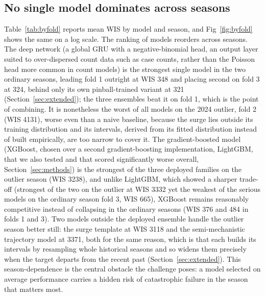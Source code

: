 \documentclass[11pt]{article}
\begin{document}
\subsection{No single model dominates across seasons}\label{sec:noseason}
Table~\ref{tab:byfold} reports mean WIS by model and season, and Fig~\ref{fig:byfold} shows the same
on a log scale. The ranking of models reorders across seasons. The deep network (a global GRU with a
negative-binomial head, an output layer suited to over-dispersed count data such as case counts,
rather than the Poisson head more common in count models) is the strongest single model in the two
ordinary seasons, leading fold 1 outright at WIS 348 and placing second on fold 3 at 324, behind
only its own pinball-trained variant at 321 (Section~\ref{sec:extended}); the three ensembles beat
it on fold 1, which is the point of combining. It is nonetheless the worst of all models on the 2024
outlier, fold 2 (WIS 4131), worse even than a naive baseline, because the surge lies outside its
training distribution and its intervals, derived from its fitted distribution instead of built
empirically, are too narrow to cover it. The gradient-boosted model (XGBoost, chosen over a second
gradient-boosting implementation, LightGBM, that we also tested and that scored significantly worse
overall, Section~\ref{sec:methods}) is the strongest of the three deployed families on the outlier
season (WIS 3238), and unlike LightGBM, which showed a sharper trade-off (strongest of the two on
the outlier at WIS 3332 yet the weakest of the serious models on the ordinary season fold 3, WIS
665), XGBoost remains reasonably competitive instead of collapsing in the ordinary seasons (WIS 376
and 484 in folds 1 and 3). Two models outside the deployed ensemble handle the outlier season better
still: the surge template at WIS 3118 and the semi-mechanistic trajectory model at 3371, both for
the same reason, which is that each builds its intervals by resampling whole historical seasons and
so widens them precisely when the target departs from the recent past
(Section~\ref{sec:extended}).
This season-dependence is the central obstacle the challenge poses: a model selected on average
performance carries a hidden risk of catastrophic failure in the season that matters most.
\end{document}
